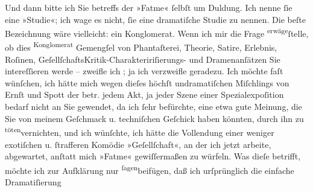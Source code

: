 \begin{ledgroupsized}[t]{13cm}
           Und dann bitte ich Sie \introOben{}betreffs\introOben{} der »Fatme« ſelbſt  um Duldung.
               Ich nenne ſie eine »Studie«; ich wage es nicht, ſie eine dramatiſche Studie zu
               nennen. Die beſte Bezeichnung wäre vielleicht: ein Konglomerat. Wenn ich \introOben{}mir\introOben{} die Frage \substVorne{}\textsuperscript{erwäge}{\allowbreak}\substDazwischen{}ſtelle\substHinten{}, ob dies \substVorne{}\textsuperscript{Konglomerat}{\allowbreak}\substDazwischen{} Gemengſel\substHinten{} von  Phantaſterei, \introOben{}Theorie, \introOben{}{ }Satire, \introOben{}Erlebnis\introOben{}, Roſinen,
                  \introOben{}Geſellſchafts\introOben{}Kritik-\introOben{}Charakteririſierungs-\introOben{} und Dramenanſätzen Sie intereſſieren werde –  zweifle ich ; ja ich verzweifle geradezu. Ich möchte
               faſt wünſchen, ich hätte mich \introOben{}wegen\introOben{} dieſes \introOben{}höchſt undramatiſchen\introOben{} Miſchlings von Ernſt und Spott \introOben{}der betr.  jedem Akt, ja jeder Szene  einer
                  Spezialexpoſition  bedarf\introOben{}{ } nicht an Sie gewendet, da ich ſehr befürchte,
               eine etwa gute Meinung, die Sie von meinem Geſchmack \introOben{}u.
                  techniſchen Geſchick\introOben{} haben könnten, durch
                  \introOben{}ihn\introOben{} zu \substVorne{}\textsuperscript{töten}\substDazwischen{}vernichten\substHinten{}, und ich wünſchte, ich hätte die Vollendung einer \introOben{}weniger
                  exotiſchen u. ſtrafferen\introOben{} Komödie »Geſellſchaft«, an der ich jetzt arbeite, abgewartet, anſtatt mich »Fatme« \introOben{}gewiſſermaßen\introOben{} zu
               würfeln.\pend
           \pstart
           Was dieſe betrifft, möchte ich zur Aufklärung nur \substVorne{}\textsuperscript{ſagen}\substDazwischen{}beifügen\substHinten{}, daß ich urſprünglich die \introOben{}einfache\introOben{} Dramatiſierung

\end{ledgroupsized}
